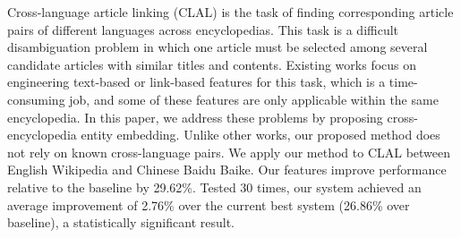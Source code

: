 Cross-language article linking (CLAL) is the task of finding corresponding article pairs of different languages across encyclopedias. This task is a difficult disambiguation problem in which one article must be selected among several candidate articles with similar titles and contents. Existing works focus on engineering text-based or link-based features for this task, which is a time-consuming job, and some of these features are only applicable within the same encyclopedia. In this paper, we address these problems by proposing cross-encyclopedia entity embedding. Unlike other works, our proposed method does not rely on known cross-language pairs. We apply our method to CLAL between English Wikipedia and Chinese Baidu Baike. Our features improve performance relative to the baseline by 29.62\%. Tested 30 times, our system achieved an average improvement of 2.76\% over the current best system (26.86\% over baseline), a statistically significant result.

